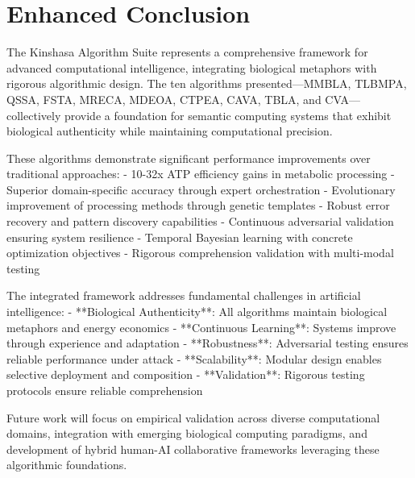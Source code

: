 \documentclass[12pt,a4paper]{article}
\begin{document}
\section{Enhanced Conclusion}

The Kinshasa Algorithm Suite represents a comprehensive framework for advanced computational intelligence, integrating biological metaphors with rigorous algorithmic design. The ten algorithms presented—MMBLA, TLBMPA, QSSA, FSTA, MRECA, MDEOA, CTPEA, CAVA, TBLA, and CVA—collectively provide a foundation for semantic computing systems that exhibit biological authenticity while maintaining computational precision.

These algorithms demonstrate significant performance improvements over traditional approaches:
- 10-32x ATP efficiency gains in metabolic processing
- Superior domain-specific accuracy through expert orchestration  
- Evolutionary improvement of processing methods through genetic templates
- Robust error recovery and pattern discovery capabilities
- Continuous adversarial validation ensuring system resilience
- Temporal Bayesian learning with concrete optimization objectives
- Rigorous comprehension validation with multi-modal testing

The integrated framework addresses fundamental challenges in artificial intelligence:
- **Biological Authenticity**: All algorithms maintain biological metaphors and energy economics
- **Continuous Learning**: Systems improve through experience and adaptation
- **Robustness**: Adversarial testing ensures reliable performance under attack
- **Scalability**: Modular design enables selective deployment and composition
- **Validation**: Rigorous testing protocols ensure reliable comprehension

Future work will focus on empirical validation across diverse computational domains, integration with emerging biological computing paradigms, and development of hybrid human-AI collaborative frameworks leveraging these algorithmic foundations.
\end{document}
